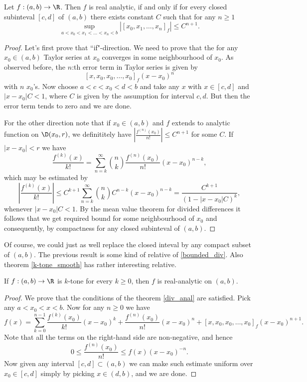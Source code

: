 \begin{lause}\label{div_anal}
	Let $f : (a, b) \to \R$. Then $f$ is real analytic, if and only if for every closed subinteval $[c, d]$ of $(a, b)$ there exists constant $C$ such that for any $n \geq 1$
	\[
		\sup_{a < x_{0} < x_{1} < \ldots < x_{n}< b} |[x_{0}, x_{1}, \ldots, x_{n}]_{f}| \leq C^{n + 1}.
	\]
\end{lause}
\begin{proof}
	Let's first prove that ``if"-direction. We need to prove that the for any $x_{0} \in (a, b)$ Taylor series at $x_{0}$ converges in some neighbourhood of $x_{0}$. As observed before, the $n$:th error term in Taylor series is given by
	\[
		[x, x_{0}, x_{0}, \ldots, x_{0}]_{f} (x - x_{0})^{n}
	\]
	with $n$ $x_{0}$'s. Now choose $a < c < x_{0} < d < b$ and take any $x$ with $x \in [c, d]$ and $|x - x_{0}| C < 1$, where $C$ is given by the assumption for interval $c, d$. But then the error term tends to zero and we are done.

	For the other direction note that if $x_{0} \in (a, b)$ and $f$ extends to analytic function on $\D(x_{0}, r)$, we definititely have $\left|\frac{f^{(n)}(x_{0})}{n!}\right| \leq C^{n + 1}$ for some $C$. If $|x - x_{0}| < r$ we have
	\[
		\frac{f^{(k)}(x)}{k!} = \sum_{n = k}^{\infty} \binom{n}{k} \frac{f^{(n)}(x_{0})}{n!} (x - x_{0})^{n - k},
	\]
	which may be estimated by
	\[
	 \left|\frac{f^{(k)}(x)}{k!}\right| \leq C^{k + 1}\sum_{n = k}^{\infty} \binom{n}{k} C^{n - k} (x - x_{0})^{n - k} = \frac{C^{k + 1} }{(1 - |x - x_{0}| C)^{k}},
	\]
	whenever $|x - x_{0}| C < 1$. By the mean value theorem for divided differences it follows that we get required bound for some neighbourhood of $x_{0}$ and consequently, by compactness for any closed subinteval of $(a, b)$.
\end{proof}

Of course, we could just as well replace the closed inteval by any compact subset of $(a, b)$. The previous result is some kind of relative of \ref{bounded_div}. Also theorem \ref{k-tone_smooth} has rather interesting relative.

\begin{lause}
	If $f : (a, b) \to \R$ is $k$-tone for every $k \geq 0$, then $f$ is real-analytic on $(a, b)$.
\end{lause}
\begin{proof}
	We prove that the conditions of the theorem \ref{div_anal} are satisfied. Pick any $a < x_{0} < x < b$. Now for any $n \geq 0$ we have
	\[
		f(x) = \sum_{k = 0}^{n - 1} \frac{f^{(k)}(x_{0})}{k!}(x - x_{0})^{k} + \frac{f^{(n)}(x_{0})}{n!} (x - x_{0})^{n} + [x, x_{0}, x_{0}, \ldots, x_{0}]_{f} (x - x_{0})^{n + 1}.
	\]
	Note that all the terms on the right-hand side are non-negative, and hence
	\[
		0 \leq \frac{f^{(n)}(x_{0})}{n!} \leq f(x) (x - x_{0})^{-n}.
	\]
	Now given any interval $[c, d] \subset (a, b)$ we can make such estimate uniform over $x_{0} \in [c, d]$ simply by picking $x \in (d, b)$, and we are done.
\end{proof}


